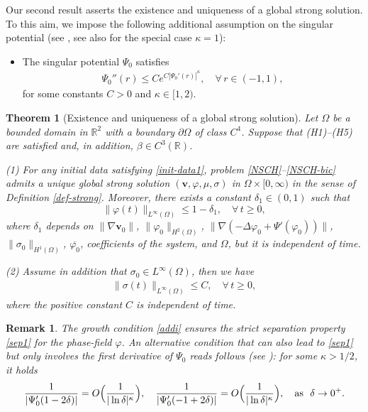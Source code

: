 \documentclass[11pt,reqno]{amsart}
\newtheorem{theorem}{\textbf{Theorem}}[section]
\newtheorem{remark}{\textbf{Remark}}[section]
\def\vv{\bm{v}}
\begin{document}
Our second result asserts the existence and uniqueness of a global strong solution. To this aim, we impose the following additional assumption on the singular potential (see \cite{GGG2023}, see also \cite{GMT2019,HW,MZ04} for the special case $\kappa=1$):
%
\begin{itemize}
\item[(H5)] The singular potential $\Psi_0$ satisfies
%
\begin{align}
	\Psi_0''(r)\leq Ce^{C|\Psi_0'(r)|^{\kappa}},
\quad\forall\,r\in(-1,1),
\label{addi}
\end{align}
%
for some constants $C>0$ and $\kappa\in[1,2)$.
\end{itemize}
%

\begin{theorem}[Existence and uniqueness of a global strong solution]
\label{Reg-SOL}
Let $\Omega$ be a bounded domain in $\mathbb{R}^2$ with a boundary $\partial \Omega$ of class $C^4$. Suppose that (H1)--(H5) are satisfied and, in addition,  $\beta\in C^3(\mathbb{R})$.

(1) For any initial data satisfying \eqref{init-data1},
problem \eqref{NSCH}--\eqref{NSCH-bic} admits a unique global strong solution $(\vv,\varphi,\mu,\sigma)$ in $\Omega\times [0,\infty)$ in the sense of Definition \ref{def-strong}. Moreover, there exists a constant $\delta_1\in (0,1)$ such that
%
\begin{equation}
  \|\varphi(t)\|_{L^{\infty}(\Omega)} \leq 1-\delta_1,\quad \forall\, t \geq 0,\label{sep1}
\end{equation}
%
where $\delta_1$ depends on $\|\nabla \vv_0\|$, $\|\varphi_0\|_{H^2(\Omega)}$, $\|\nabla (-\Delta \varphi_0+\Psi'(\varphi_0))\|$, $\|\sigma_0\|_{H^1(\Omega)}$, $\overline{\varphi_0}$, coefficients of the system, and $\Omega$, but it is independent of time.

(2) Assume in addition that $\sigma_0\in L^\infty(\Omega)$, then we have
%
\begin{align}
\|\sigma(t)\|_{L^\infty(\Omega)}\leq C, \quad \forall\, t\geq 0,
\label{sig-Linfty}
\end{align}
%
where the positive constant $C$ is independent of time.
\end{theorem}
%
\begin{remark}\rm
The growth condition \eqref{addi} ensures the strict separation property \eqref{sep1} for the phase-field $\varphi$. An alternative condition that can also lead to \eqref{sep1} but only involves the first derivative of $\Psi_0$ reads follows (see \cite{Gal2025}): for some $\kappa>1/2$, it holds
\begin{align}
\frac{1}{|\Psi_0'(1-2\delta)|}=O\Big(\frac{1}{|\ln \delta|^{\kappa}}\Big), \quad\frac{1}{|\Psi_0'(-1+2\delta)|}=O\Big(\frac{1}{|\ln \delta|^{\kappa}}\Big),\quad
\text{as}\ \ \delta\rightarrow0^{+}.
\notag
\end{align}
\end{remark}
\end{document}
